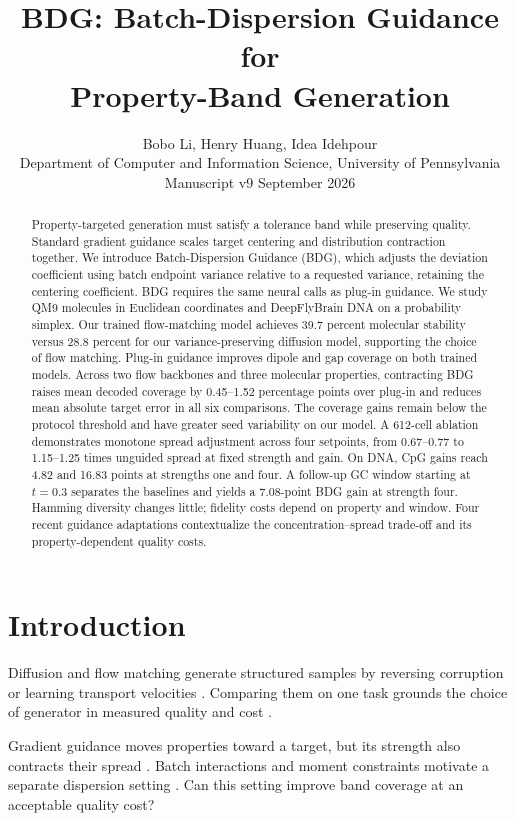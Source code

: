 \documentclass{article}
\title{BDG: Batch-Dispersion Guidance for\\Property-Band Generation}
\author{Bobo Li, Henry Huang, Idea Idehpour\\
Department of Computer and Information Science, University of Pennsylvania\\
\small Manuscript v9 \quad 29 September 2026}
\begin{document}
\maketitle
\begin{abstract}
Property-targeted generation must satisfy a tolerance band while preserving quality. Standard gradient guidance scales target centering and distribution contraction together. We introduce Batch-Dispersion Guidance (BDG), which adjusts the deviation coefficient using batch endpoint variance relative to a requested variance, retaining the centering coefficient. BDG requires the same neural calls as plug-in guidance. We study QM9 molecules in Euclidean coordinates and DeepFlyBrain DNA on a probability simplex. Our trained flow-matching model achieves 39.7 percent molecular stability versus 28.8 percent for our variance-preserving diffusion model, supporting the choice of flow matching. Plug-in guidance improves dipole and gap coverage on both trained models. Across two flow backbones and three molecular properties, contracting BDG raises mean decoded coverage by 0.45--1.52 percentage points over plug-in and reduces mean absolute target error in all six comparisons. The coverage gains remain below the protocol threshold and have greater seed variability on our model. A 612-cell ablation demonstrates monotone spread adjustment across four setpoints, from 0.67--0.77 to 1.15--1.25 times unguided spread at fixed strength and gain. On DNA, CpG gains reach 4.82 and 16.83 points at strengths one and four. A follow-up GC window starting at $t=0.3$ separates the baselines and yields a 7.08-point BDG gain at strength four. Hamming diversity changes little; fidelity costs depend on property and window. Four recent guidance adaptations contextualize the concentration--spread trade-off and its property-dependent quality costs.
\end{abstract}

\section{Introduction}
Diffusion and flow matching generate structured samples by reversing corruption or learning transport velocities \citep{karras2022elucidating,lipman2022flow}. Comparing them on one task grounds the choice of generator in measured quality and cost \citep{albergo2025stochastic}.

Gradient guidance moves properties toward a target, but its strength also contracts their spread \citep{chung2023dps,song2023lgd}. Batch interactions and moment constraints motivate a separate dispersion setting \citep{corso2024particle,mgd2026moment}. Can this setting improve band coverage at an acceptable quality cost?
\end{document}

